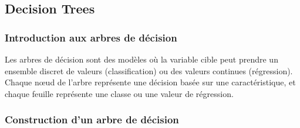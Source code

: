 \documentclass[10pt,a4paper]{article}
\begin{document}
\subsection*{Decision Trees}

\subsubsection*{Introduction aux arbres de décision}

Les arbres de décision sont des modèles où la variable cible peut prendre un ensemble discret de valeurs (classification) ou des valeurs continues (régression). Chaque nœud de l'arbre représente une décision basée sur une caractéristique, et chaque feuille représente une classe ou une valeur de régression.

\subsubsection*{Construction d'un arbre de décision}
\end{document}
